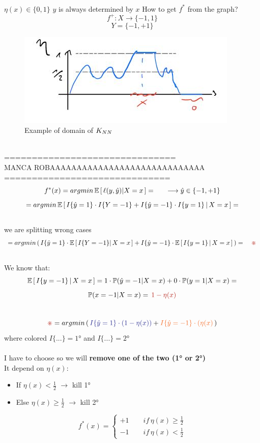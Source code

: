 \documentclass[../main.tex]{subfiles}
\begin{document}
\\
$\eta(x) \in \{0,1\} $ \qquad $y$ is always determined by $x$
\newpage
How to get $f^*$ from the graph?
\\
$$
f^+ : X \rightarrow \{-1,1\}
$$
$$
Y = \{-1, +1 \}
$$
\begin{figure}[h]
    \centering
    \includegraphics[width=0.7\linewidth]{../img/lez6-img3.JPG}
    \caption{Example of domain of $K_{NN}$}
\end{figure}
\\
===============================\\
MANCA ROBAAAAAAAAAAAAAAAAAAAAAAAAAAAAA\\
==============================
$$
f^*(x) = argmin \, \mathbb{E} \left[ \,  \ell(y, \hat{y}) | X= x\, \right] =  \qquad \longrightarrow \hat{y} \in \{-1,+1 \}
$$
$$
= argmin \,  \mathbb{E} \left[ \, I\{\hat{y} = 1\} \cdot I\{Y=-1\} + I\{\hat{y}=-1\} \cdot I\{y=1\} \, | \, X = x \, \right] =
$$
\\
we are splitting wrong cases
\\
$$
= argmin \, (  \, I\{\hat{y} = 1\} \cdot \barra{E} \left[ \, I\{Y=-1\} |\, X = x\, \right] + I\{\hat{y}=-1\} \cdot \barra{E} \left[ \, I\{y=1\} \, | \, X = x \, \right] \, ) =  \quad \red{\divideontimes}
$$\\
We know that: $$ \mathbb{E} \left[ \, I \{y = -1 \} \, | \, X = x \, \right] = 1 \cdot \mathbb{P} \\ (\hat{y} = -1 | X = x ) + 0 \cdot \mathbb{P} (y = 1 | X= x) =  
$$
$$
\barra{P} (x = -1 | X=x ) = \, \red{ 1- \eta(x) }
$$\\
$$
 \red{\divideontimes} =   argmin \, (  \, \col{I\{\hat{y} = 1\} \cdot (1 - \eta(x))}{Blue} + \col{I \{ \hat{y} = -1\} \cdot (\eta(x)}{Orange} \, )
$$
where  colored $I \{...\} = 1$° and  $I \{...\} = 2$°
\\\\
I have to choose  so we will \textbf{remove one of the two (1° or 2°) }
\\
It depend on $\eta(x)$:
\begin{itemize}
\item  If $\eta(x) < \frac{1}{2}$ \quad $\longrightarrow$ \quad kill 1°
\item  Else $\eta(x) \geq \frac{1}{2}$ \quad $\longrightarrow$ \quad kill 2°
\end{itemize}
$$
f^*(x) = 
\begin{cases}
+1 \qquad if \, \eta(x) \geq \frac{1}{2}\\
-1 \qquad if \, \eta(x) < \frac{1}{2}
\end{cases}
$$
\end{document}
